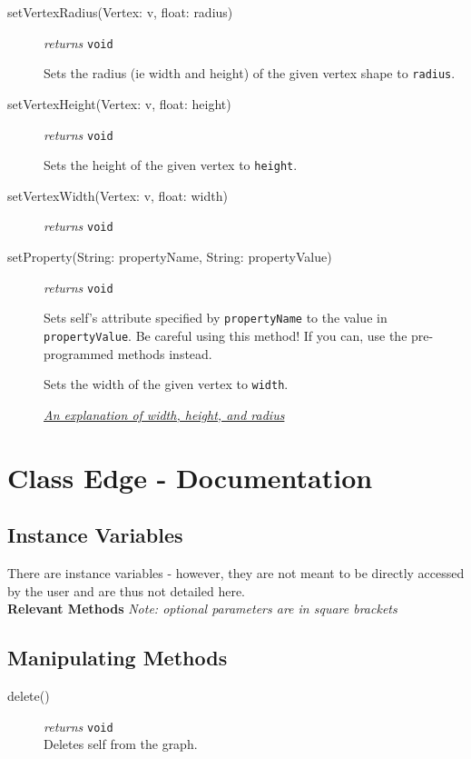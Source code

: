 \documentclass{article}
\newlength\q
\begin{document}
\begin{description}
\item[setVertexRadius(Vertex: v, float: radius)] \emph{returns}
  \texttt{void}

Sets the radius (ie width and height) of the given vertex shape to \texttt{radius}.

\item[setVertexHeight(Vertex: v, float: height)] \emph{returns}
  \texttt{void}

Sets the height of the given vertex to \texttt{height}.

\item[setVertexWidth(Vertex: v, float: width)] \emph{returns}
  \texttt{void}
  
\item[setProperty(String: propertyName, String: propertyValue)] \emph{returns} \texttt{void}

Sets self's attribute specified by \texttt{propertyName} to the value in \texttt{propertyValue}. Be careful using this method! If you can, use the pre-programmed methods instead.

Sets the width of the given vertex to \texttt{width}. 

\hyperref[radiusWidthHeightDiagram]{\textit{An explanation of width, height, and radius}}

\end{description}

\section{Class Edge - Documentation}

\subsection{Instance Variables}
There are instance variables - however, they are not meant to be directly accessed by the user and are thus not detailed here.\\

\textbf{{\large Relevant Methods}}
\textit{Note: optional parameters are in square brackets}
\subsection{Manipulating Methods}
\begin{description}
\item[delete()] \emph{returns} \texttt{void}\\
Deletes self from the graph.



\end{description}
\end{document}
